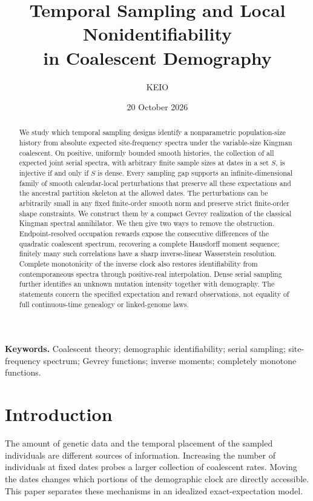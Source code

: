 \documentclass[11pt]{article}
\title{Temporal Sampling and Local Nonidentifiability\\in Coalescent Demography}
\author{KEIO}
\date{20 October 2026}
\theoremstyle{definition}
\theoremstyle{remark}
\numberwithin{equation}{section}
\begin{document}
\maketitle
\begin{abstract}
We study which temporal sampling designs identify a nonparametric
population-size history from absolute expected site-frequency spectra
under the variable-size Kingman coalescent. On positive, uniformly bounded
smooth histories, the collection of all expected joint serial spectra,
with arbitrary finite sample sizes at dates in a set $S$, is injective
if and only if $S$ is dense. Every sampling gap supports an
infinite-dimensional family of smooth calendar-local perturbations that
preserve all these expectations and the ancestral partition skeleton at
the allowed dates. The perturbations can be arbitrarily small in any
fixed finite-order smooth norm and preserve strict finite-order shape
constraints. We construct them by a compact Gevrey realization of the
classical Kingman spectral annihilator. We then give two ways to remove
the obstruction. Endpoint-resolved occupation rewards expose the
consecutive differences of the quadratic coalescent spectrum, recovering
a complete Hausdorff moment sequence; finitely many such correlations
have a sharp inverse-linear Wasserstein resolution. Complete monotonicity
of the inverse clock also restores identifiability from contemporaneous
spectra through positive-real interpolation. Dense serial sampling further
identifies an unknown mutation intensity together with demography.
The statements concern the specified expectation and reward observations,
not equality of full continuous-time genealogy or linked-genome laws.
\end{abstract}
\noindent\textbf{Keywords.} Coalescent theory; demographic identifiability;
serial sampling; site-frequency spectrum; Gevrey functions; inverse moments;
completely monotone functions.

\section{Introduction}

The amount of genetic data and the temporal placement of the sampled
individuals are different sources of information. Increasing the number
of individuals at fixed dates probes a larger collection of coalescent
rates. Moving the dates changes which portions of the demographic clock
are directly accessible. This paper separates these mechanisms in an
idealized exact-expectation model.
\end{document}
